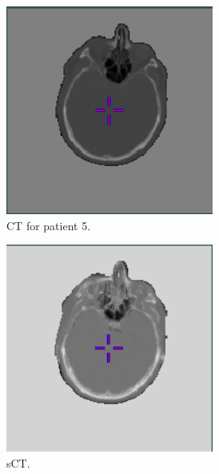 \begin{figure}
\begin{subfigure}[b]{0.3\textwidth}
        \includegraphics[width=0.75\textwidth]{colager/loocv_ct/loocv_011030_ct.png}
        \caption{CT for patient 5.}
        \label{col:loocv_ct_pat5_ct}
    \end{subfigure}\hfill
    \begin{subfigure}[b]{0.3\textwidth}
        \centering
        \includegraphics[width=0.75\textwidth]{colager/loocv_ct/loocv_011030_sct.png}
        \caption{sCT.}
        \label{col:loocv_ct_pat5_sct}
    \end{subfigure}\hfill
    \begin{subfigure}[b]{0.3\textwidth}
        \centering

\end{subfigure}
\end{figure}
